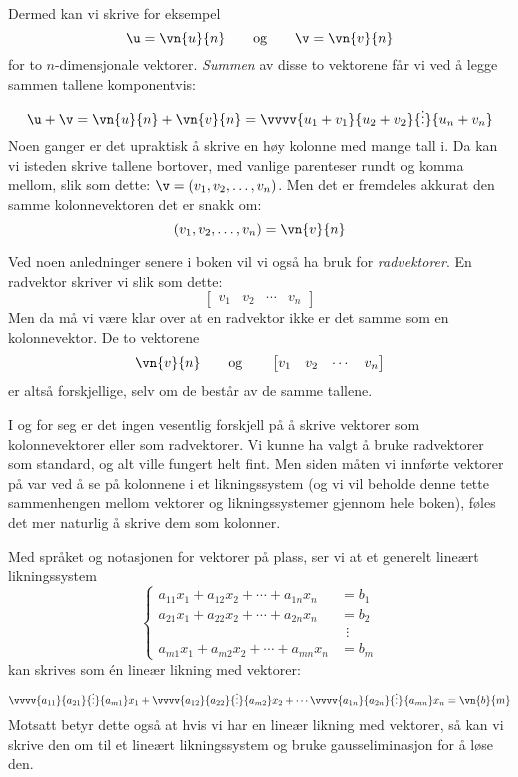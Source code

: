 Dermed kan vi skrive for eksempel
\[
\u = \vn{u}{n}
\qquad\text{og}\qquad
\v = \vn{v}{n}
\]
for to $n$-dimensjonale vektorer.  \emph{Summen} av disse to vektorene
får vi ved å legge sammen tallene komponentvis:
\[
\u + \v
= \vn{u}{n} + \vn{v}{n}
= \vvvv{u_1 + v_1}{u_2 + v_2}{\vdots}{u_n + v_n}
\]
Noen ganger er det upraktisk å skrive en høy kolonne med mange tall i.
Da kan vi isteden skrive tallene bortover, med vanlige parenteser
rundt og komma mellom, slik som dette: $\v = (v_1, v_2, \ldots, v_n)$.
Men det er fremdeles akkurat den samme kolonnevektoren det er snakk om:
\[
(v_1, v_2, \ldots, v_n) = \vn{v}{n}
\]

Ved noen anledninger senere i boken vil vi også ha bruk for
\emph{radvektorer}.  En radvektor skriver vi slik som dette:
\[
\begin{bmatrix}
v_{1} & v_{2} & \cdots & v_{n}
\end{bmatrix}
\]
Men da må vi være klar over at en radvektor ikke er det samme som en
kolonnevektor.  De to vektorene
\[
\vn{v}{n}
\qquad\text{og}\qquad
\begin{bmatrix}
v_{1} & v_{2} & \cdots & v_{n}
\end{bmatrix}
\]
er altså forskjellige, selv om de består av de samme tallene.

I og for seg er det ingen vesentlig forskjell på å skrive vektorer som
kolonnevektorer eller som radvektorer.  Vi kunne ha valgt å bruke
radvektorer som standard, og alt ville fungert helt fint.  Men siden
måten vi innførte vektorer på var ved å se på kolonnene i et
likningssystem (og vi vil beholde denne tette sammenhengen mellom
vektorer og likningssystemer gjennom hele boken), føles det mer
naturlig å skrive dem som kolonner.

\smallskip%
Med språket og notasjonen for vektorer på plass, ser vi at
et generelt lineært likningssystem
\[
\left\{
\begin{aligned}
  a_{11} x_1 + a_{12} x_2 + \cdots + a_{1n} x_n &= b_1 \\
  a_{21} x_1 + a_{22} x_2 + \cdots + a_{2n} x_n &= b_2 \\
                                                &\ \ \vdots \\
  a_{m1} x_1 + a_{m2} x_2 + \cdots + a_{mn} x_n &= b_m
\end{aligned}
\right.
\]
kan skrives som én lineær likning med vektorer:
\[
\vvvv{a_{11}}{a_{21}}{\vdots}{a_{m1}} x_1 +
\vvvv{a_{12}}{a_{22}}{\vdots}{a_{m2}} x_2 +
\cdots
\vvvv{a_{1n}}{a_{2n}}{\vdots}{a_{mn}} x_n
=
\vn{b}{m}
\]
Motsatt betyr dette også at hvis vi har en lineær likning med
vektorer, så kan vi skrive den om til et lineært likningssystem og
bruke gausseliminasjon for å løse den.


